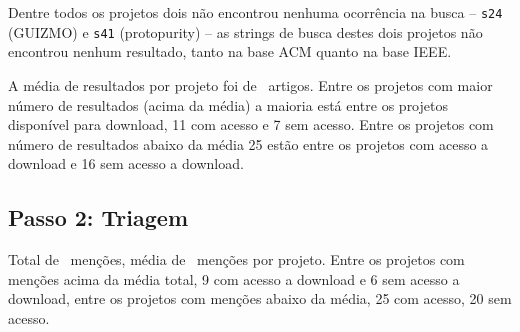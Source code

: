 Dentre todos os projetos dois não encontrou nenhuma ocorrência na busca --
\texttt{s24} (GUIZMO) e \texttt{s41} (protopurity) -- as strings de busca
destes dois projetos não encontrou nenhum resultado, tanto na base ACM quanto
na base IEEE.

A média de resultados por projeto foi de \SearchUniqueMean \ artigos. Entre os
projetos com maior número de resultados (acima da média) a maioria está entre
os projetos disponível para download, 11 com acesso e 7 sem acesso.
Entre os projetos com número de resultados abaixo da média 25 estão entre os
projetos com acesso a download e 16 sem acesso a download.



\subsection{Passo 2: Triagem}

Total de \ScreeningCount \ menções, média de \ScreeningMean \ menções por
projeto.  Entre os projetos com menções acima da média total, 9 com acesso a
download e 6 sem acesso a download, entre os projetos com menções abaixo da
média, 25 com acesso, 20 sem acesso.


